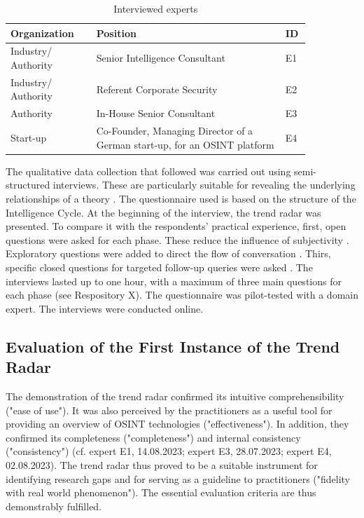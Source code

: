 \documentclass[10pt]{article}
\begin{document}
\begin{table}[htbp]
    \caption{Interviewed experts}
    \begin{tabular}{|p{0.25\linewidth}|p{0.55\linewidth}|p{0.05\linewidth}|}
        \hline
        \textbf{Organization} & \textbf{Position}                                                         & \textbf{ID} \\
        \hline
        Industry/ Authority   & Senior Intelligence Consultant                                            & E1          \\
        \hline
        Industry/ Authority   & Referent Corporate Security                                               & E2          \\
        \hline
        Authority             & In-House Senior Consultant                                                & E3          \\
        \hline
        Start-up              & Co-Founder, Managing Director of a German start-up, for an OSINT platform & E4          \\
        \hline
    \end{tabular}
    \label{tab:experts}
\end{table}

The qualitative data collection that followed was carried out using
semi-structured interviews. These are particularly suitable for
revealing the underlying relationships of a theory \cite{Bogner.2014}. The
questionnaire used is based on the structure of the Intelligence Cycle.
At the beginning of the interview, the trend radar was presented.
To compare it with the respondents' practical experience, first, open questions
were asked for each phase. These reduce the influence of
subjectivity \cite{Saunders.2012}. Exploratory questions were added to direct the flow of conversation
\cite{Saunders.2012}. Thirs, specific closed questions for targeted follow-up
queries were asked \cite{Saunders.2012}. The interviews lasted up to one hour, with a maximum of three
main questions for each phase \cite{Bogner.2014} (see Respository X). The questionnaire
was pilot-tested with a domain expert. The interviews were conducted online.

\subsection{Evaluation of the First Instance of the Trend Radar}

The demonstration of the trend radar confirmed its intuitive
comprehensibility ("ease of use"). It was also perceived by the
practitioners as a useful tool for providing an overview of OSINT
technologies ("effectiveness"). In addition, they confirmed its
completeness ("completeness") and internal consistency ("consistency")
(cf. expert E1, 14.08.2023; expert E3, 28.07.2023; expert E4,
02.08.2023). The trend radar thus proved to be a
suitable instrument for identifying research gaps and for serving as a guideline to practitioners
("fidelity with real world phenomenon"). The essential evaluation
criteria \cite{Sonnenberg.2012} are thus demonstrably fulfilled.
\end{document}
